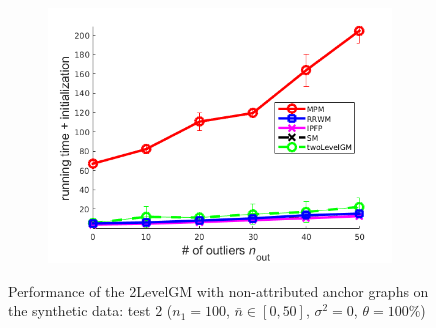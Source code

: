 \begin{figure}
\begin{subfigure}[b]{0.33\textwidth}
		\includegraphics[scale=0.25]{"chapter3/fig/SyntheticTest/no_descr/Results_v4.3.3/Test3/time_summary_avg10t"} 
	\end{subfigure} 	
	\caption[Performance of the 2LevelGM with non-attributed anchor graphs on the synthetic data (test $2$)]{Performance of the 2LevelGM with non-attributed anchor graphs on the synthetic data: test $2$ ($n_1=100$, $\bar{n}\in[0,50]$, $\sigma^2=0$, $\theta=100\%$)}
	\label{fig:synTest2_ver433}
\end{figure}

